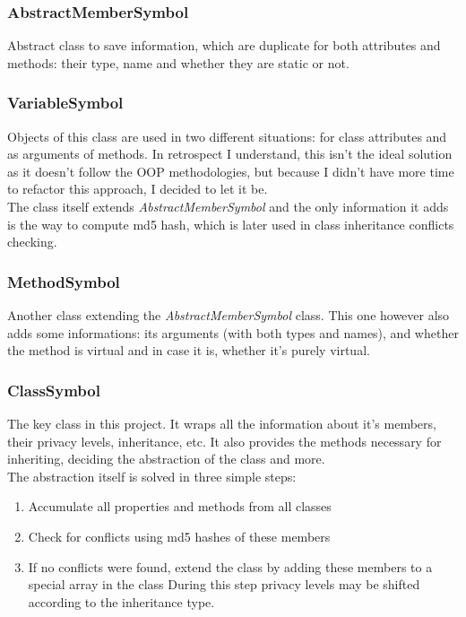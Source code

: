 \documentclass[10pt,a4paper]{article}[14.03.2017]
\begin{document}
			\subsubsection{AbstractMemberSymbol}
				Abstract class to save information, which are duplicate for both attributes and methods: their type, name and whether they are static or not.
			\subsubsection{VariableSymbol}
				Objects of this class are used in two different situations: for class attributes and as arguments of methods. In retrospect I understand, this isn't the ideal solution as it doesn't follow the OOP methodologies, but because I didn't have more time to refactor this approach, I decided to let it be.\\
				The class itself extends \emph{AbstractMemberSymbol} and the only information it adds is the way to compute md5 hash, which is later used in class inheritance conflicts checking.
			\subsubsection{MethodSymbol}
				Another class extending the \emph{AbstractMemberSymbol} class. This one however also adds some informations: its arguments (with both types and names), and whether the method is virtual and in case it is, whether it's purely virtual.
			\subsubsection{ClassSymbol}
				The key class in this project. It wraps all the information about it's members, their privacy levels, inheritance, etc. It also provides the methods necessary for inheriting, deciding the abstraction of the class and more.\\
				The abstraction itself is solved in three simple steps:
				\begin{enumerate}
					\item Accumulate all properties and methods from all classes
					\item Check for conflicts using md5 hashes of these members
					\item If no conflicts were found, extend the class by adding these members to a special array in the class
						\subitem During this step privacy levels may be shifted according to the inheritance type.
				\end{enumerate}
\end{document}

